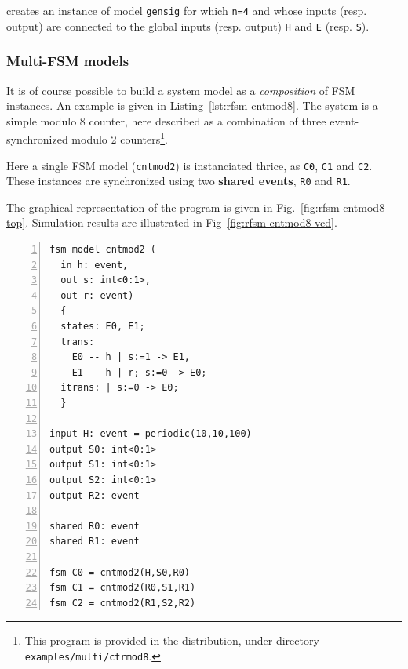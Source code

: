 \begin{center}
\end{center}

creates an instance of model \verb|gensig| for which \verb|n=4| and whose inputs (resp. output) are
connected to the global inputs (resp. output) \texttt{H} and \texttt{E} (resp. \texttt{S}).

\subsubsection*{Multi-FSM models}
\label{sec:multi-fsm-models}

It is of course possible to build a system model as a \emph{composition} of FSM instances.  An
example is given in Listing~\ref{lst:rfsm-cntmod8}. The system is a simple modulo 8 counter, here
described as a combination of three event-synchronized modulo 2 counters\footnote{This program is
  provided in the distribution, under directory \texttt{examples/multi/ctrmod8}.}.

\medskip
Here a single FSM model (\texttt{cntmod2}) is instanciated thrice, as \texttt{C0}, \texttt{C1} and
\texttt{C2}. These instances are synchronized using two \textbf{shared events}, \texttt{R0} and \texttt{R1}. 

\medskip
The graphical representation of the program is given in Fig.~\ref{fig:rfsm-cntmod8-top}. Simulation
results are illustrated in Fig~\ref{fig:rfsm-cntmod8-vcd}. 

\begin{lstlisting}[language=Rfsm,frame=single,numbers=left,caption=A multi-model RFSM
  program,label={lst:rfsm-cntmod8},float]
fsm model cntmod2 (
  in h: event,
  out s: int<0:1>,
  out r: event)
  {
  states: E0, E1;
  trans:
    E0 -- h | s:=1 -> E1,
    E1 -- h | r; s:=0 -> E0;
  itrans: | s:=0 -> E0;
  }

input H: event = periodic(10,10,100)
output S0: int<0:1>
output S1: int<0:1>
output S2: int<0:1>
output R2: event

shared R0: event
shared R1: event

fsm C0 = cntmod2(H,S0,R0) 
fsm C1 = cntmod2(R0,S1,R1) 
fsm C2 = cntmod2(R1,S2,R2) 
\end{lstlisting}

